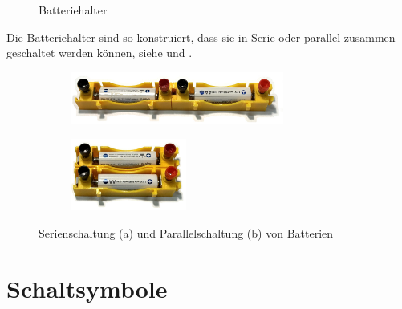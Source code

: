\begin{figure}[h!]
    \centering

    \caption{Batteriehalter}
    \label{fig:batteryholder}
\end{figure}

Die Batteriehalter sind so konstruiert, dass sie in Serie oder parallel
zusammen geschaltet werden können, siehe  und .

\begin{figure}[h!]
    \centering
    \begin{subfigure}[b]{0.4\textwidth}
    \centering
    \includegraphics[width=7cm]{_images/batterie_seriell}
    \caption{\label{fig:batteryholder_serial}}
    \end{subfigure}
    \quad
    \begin{subfigure}[b]{0.4\textwidth}
    \centering
    \includegraphics[width=3.8cm]{_images/batterie_parallel}
    \caption{\label{fig:batteryholder_parallel}}
    \end{subfigure}

    \caption{Serienschaltung (a) und Parallelschaltung (b) von Batterien}
\end{figure}


\section{Schaltsymbole}


